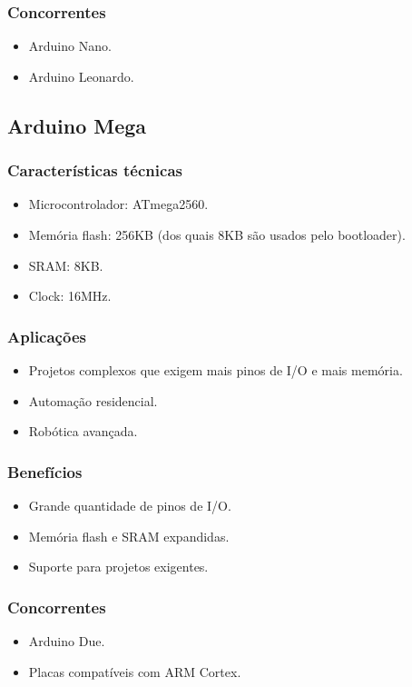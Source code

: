 \documentclass{estacio}
\begin{document}
\subsubsection{Concorrentes}
\begin{itemize}
    \item Arduino Nano.
    \item Arduino Leonardo.
\end{itemize}

\subsection{Arduino Mega}
\subsubsection{Características técnicas}
\begin{itemize}
    \item Microcontrolador: ATmega2560.
    \item Memória flash: 256KB (dos quais 8KB são usados pelo bootloader).
    \item SRAM: 8KB.
    \item Clock: 16MHz.
\end{itemize}
\subsubsection{Aplicações}
\begin{itemize}
    \item Projetos complexos que exigem mais pinos de I/O e mais memória.
    \item Automação residencial.
    \item Robótica avançada.
\end{itemize}
\subsubsection{Benefícios}
\begin{itemize}
    \item Grande quantidade de pinos de I/O.
    \item Memória flash e SRAM expandidas.
    \item Suporte para projetos exigentes.
\end{itemize}
\subsubsection{Concorrentes}
\begin{itemize}
    \item Arduino Due.
    \item Placas compatíveis com ARM Cortex.
\end{itemize}
\end{document}

